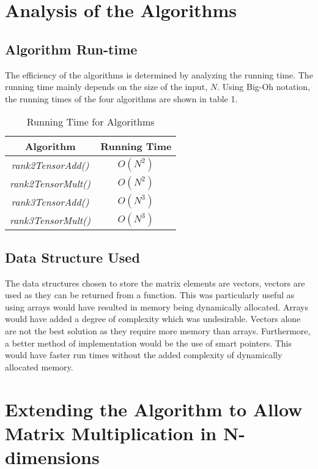 \documentclass[twocolumn, 11pt]{IEEEtran}
\begin{document}
\section{Analysis of the Algorithms}

\subsection{Algorithm Run-time}

The efficiency of the algorithms is determined by analyzing the running time. The running time mainly depends on the size of the input, $N$. Using Big-Oh notation, the running times of the four algorithms are shown in table 1.

\begin{table}[H]
\caption{Running Time for Algorithms}
\label{table_example}
\begin{center}
\begin{tabular}{|c|c|}
\hline
Algorithm & Running Time\\
\hline
\textit{rank2TensorAdd()} & $O(N^{2})$\\
\hline
\textit{rank2TensorMult()} & $O(N^{2})$ \\
\hline
\textit{rank3TensorAdd()} & $O(N^{3})$ \\
\hline
\textit{rank3TensorMult()} & $O(N^{3})$ \\
\hline
\end{tabular}
\end{center}
\end{table}

\subsection{Data Structure Used}

The data structures chosen to store the matrix elements are vectors, vectors are used as they can be returned from a function. This was particularly useful as using arrays would have resulted in memory being dynamically allocated. Arrays would have added a degree of complexity which was undesirable. Vectors alone are not the best solution as they require more memory than arrays. Furthermore, a better method of implementation would be the use of smart pointers. This would have faster run times without the added complexity of dynamically allocated memory. 

\section{Extending the Algorithm to Allow Matrix Multiplication in N-dimensions }
\end{document}
